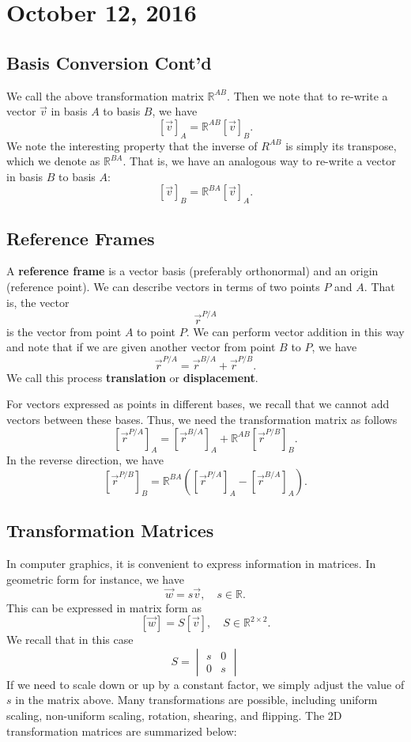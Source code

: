 \documentclass[11pt]{article}
\theoremstyle{plain} %
\theoremstyle{definition}
\theoremstyle{example}
\theoremstyle{remark}
\begin{document}
\section{October 12, 2016}
\subsection{Basis Conversion Cont'd}

We call the above transformation matrix $\mathbb R^{AB}$. Then we note that to re-write a vector $\vec{v}$ in basis $A$ to basis $B$, we have
$$\left[\vec{v}\right]_A = \mathbb R^{AB}\left[\vec{v}\right]_B.$$ We note the interesting property that the inverse of $R^{AB}$ is simply its transpose, which we denote as  $\mathbb R^{BA}$. That is, we have an analogous way to re-write a vector in basis $B$ to basis $A$:
$$\left[\vec{v}\right]_B = \mathbb  R^{BA}\left[\vec{v}\right]_A.$$

\subsection{Reference Frames}
A \textbf{reference frame} is a vector basis (preferably orthonormal) and an origin (reference point). We can describe vectors in terms of two points $P$ and $A$. That is, the vector $$\vec{r}^{P/A}$$ is the vector from point $A$ to point $P$. We can perform vector addition in this way and note that if we are given another vector from point $B$ to $P$, we have
$$\vec{r}^{P/A} = \vec{r}^{B/A}+\vec{r}^{P/B}.$$
We call this process \textbf{translation} or \textbf{displacement}.

For vectors expressed as points in different bases, we recall that we cannot add vectors between these bases. Thus, we need the transformation matrix as follows
$$\left[\vec{r}^{P/A} \right]_A = \left[\vec{r}^{B/A}\right]_A + \mathbb R^{AB} \left[\vec{r}^{P/B}\right]_B.$$
In the reverse direction, we have
$$\left[\vec{r}^{P/B}\right]_B = \mathbb R^{BA} \left( \left[\vec{r}^{P/A} \right]_A -    \left[\vec{r}^{B/A}\right]_A  \right).$$

\subsection{Transformation Matrices}
In computer graphics, it is convenient to express information in matrices. In geometric form for instance, we have
$$\vec{w} = s\vec{v}, \quad s \in \mathbb R.$$
This can be expressed in matrix form as 
$$\left[\vec{w}\right] = S\left[\vec{v}\right], \quad S\in\mathbb R^{2\times2}.$$
We recall that in this case $$S = \begin{vmatrix} s & 0 \\ 0 & s \end{vmatrix}$$
If we need to scale down or up by a constant factor, we simply adjust the value of $s$ in the matrix above. Many transformations are possible, including uniform scaling, non-uniform scaling, rotation, shearing, and flipping. The 2D transformation matrices are summarized below:
\end{document}

